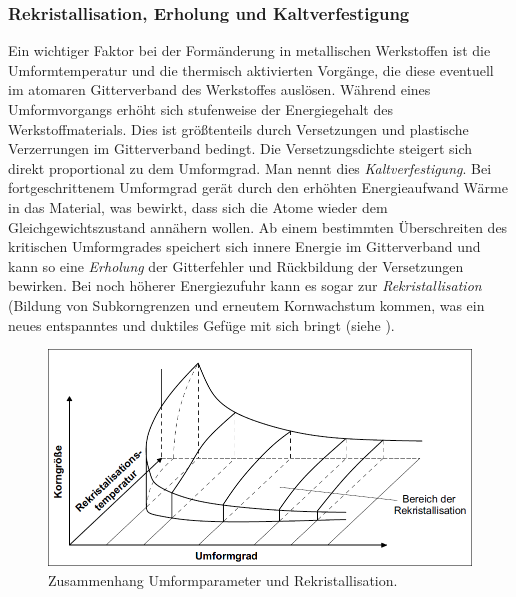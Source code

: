 \documentclass[12pt,a4paper,parskip,twoside,BCOR5mm,headsepline]{scrartcl}
\begin{document}
\begin{description*}
\begin{itemize*}
\subsubsection{Rekristallisation, Erholung und Kaltverfestigung}
Ein wichtiger Faktor bei der Formänderung in metallischen Werkstoffen ist die Umformtemperatur und die thermisch aktivierten Vorgänge,  die diese eventuell im atomaren Gitterverband des Werkstoffes auslösen. Während eines Umformvorgangs erhöht sich stufenweise der Energiegehalt des Werkstoffmaterials. Dies ist größtenteils durch Versetzungen und plastische Verzerrungen im Gitterverband bedingt. Die Versetzungsdichte steigert sich direkt proportional zu dem Umformgrad. Man nennt dies \emph{Kaltverfestigung}. Bei fortgeschrittenem Umformgrad gerät durch den erhöhten Energieaufwand Wärme in das Material,  was bewirkt, dass sich die Atome wieder dem Gleichgewichtszustand annähern wollen. Ab einem bestimmten Überschreiten des kritischen Umformgrades speichert sich innere Energie im Gitterverband und kann so eine \emph{Erholung} der Gitterfehler und Rückbildung der Versetzungen bewirken. Bei noch höherer Energiezufuhr kann es sogar zur \emph{Rekristallisation} (Bildung von Subkorngrenzen und erneutem Kornwachstum kommen, was ein neues entspanntes und duktiles Gefüge mit sich bringt (siehe ).                   
 \autocite[11-13]{fu}
\begin{figure}
\centering
\includegraphics[width=.8\textwidth]{rekristall}
\caption[Zusammenhang Umformparameter und Rekristallisation]{Zusammenhang Umformparameter und Rekristallisation. \autocite[13]{fu}}
\label{fig:rekristall}
\end{figure}







\end{itemize*}
\end{description*}
\end{document}
